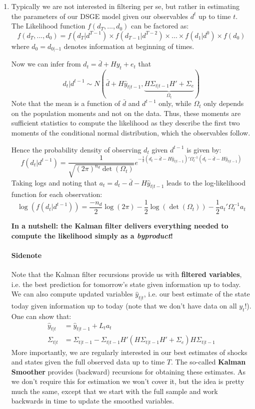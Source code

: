 \begin{enumerate}
	\item Typically we are not interested in filtering per se, but rather in estimating the parameters of our DSGE model given our observables $d^t$ up to time $t$. The Likelihood function $f(d_T,...,d_0)$ can be factored as:
		$$f(d_T,...,d_0) = f(d_T|d^{T-1}) \times f(d_{T-1}|d^{T-2}) \times ... \times f(d_1|d^{0}) \times f(d_0)$$
		where $d_0 = d_{0|-1}$ denotes information at beginning of times.

		Now we can infer from $d_t = \bar{d} + H y_t + e_t$ that
		$$d_t|d^{t-1} \sim N(\bar{d}+H\hat{y}_{t|t-1},\underbrace{H\Sigma_{t|t-1}H' + \Sigma_e}_{\Omega_t})$$
		Note that the mean is a function of $\bar{d}$ and $d^{t-1}$ only, while $\Omega_t$ only depends on the population moments and not on the data. Thus, these moments are sufficient statistics to compute the likelihood as they describe the first two moments of the conditional normal distribution, which the observables follow.

		Hence the probability density of observing $d_t$ given $d^{t-1}$ is given by:
		$$f(d_t|d^{t-1})=\frac{1}{\sqrt{(2\pi)^{n_d}\det(\Omega_t)}} e^{-\frac{1}{2}(d_t - \bar{d} - H\hat{y}_{t|t-1})'\Omega_t^{-1}(d_t - \bar{d} - H\hat{y}_{t|t-1})}$$
		Taking logs and noting that $a_t = d_t - \bar{d} - H\hat{y}_{t|t-1}$ leads to the log-likelihood function for each observation:
		$$\log(f(d_t|d^{t-1})) = \frac{-n_d}{2}\log(2\pi) -\frac{1}{2}\log(\det(\Omega_t)) - \frac{1}{2} a_t' \Omega_t^{-1} a_t$$

		\textbf{In a nutshell: the Kalman filter delivers everything needed to compute the likelihood simply as a \emph{byproduct}!}
		\paragraph{Sidenote} Note that the Kalman filter recursions provide us with \textbf{filtered variables}, i.e. the best prediction for tomorrow's state given information up to today. We can also compute updated variables $\hat{y}_{t|t}$, i.e. our best estimate of the state today given information up to today (note that we don't have data on all $y_t$!). One can show that:
		\begin{align*}
		\hat{y}_{t|t} &= \hat{y}_{t|t-1} + L_ta_t
		\\
		\Sigma_{t|t} &= \Sigma_{t|t-1} - \Sigma_{t|t-1}H'(H\Sigma_{t|t-1}H'+\Sigma_e)H\Sigma_{t|t-1}	
		\end{align*}
		More importantly, we are regularly interested in our best estimates of shocks and states given the full observed data up to time $T$. The so-called \textbf{Kalman Smoother} provides (backward) recursions for obtaining these estimates. As we don't require this for estimation we won't cover it, but the idea is pretty much the same, except that we start with the full sample and work backwards in time to update the smoothed variables.
	

\end{enumerate}
